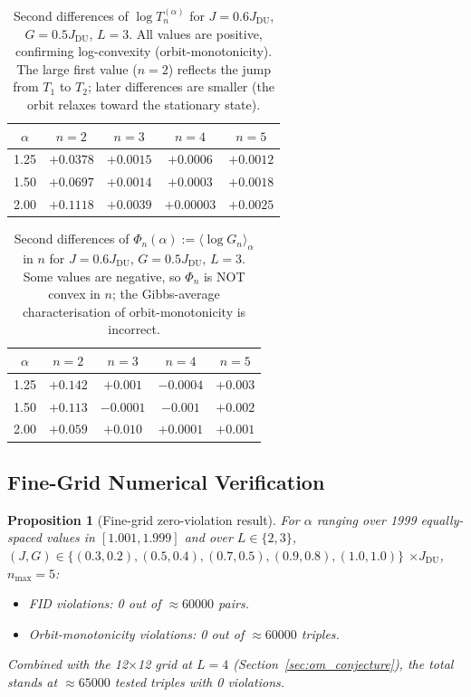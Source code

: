 \documentclass[12pt,a4paper]{article}
\newtheorem{proposition}[theorem]{Proposition}
\begin{document}
\begin{table}[h!]
\centering
\caption{Second differences of $\log T_n^{(\alpha)}$ for $J=0.6J_{\mathrm{DU}}$,
$G=0.5J_{\mathrm{DU}}$, $L=3$.
All values are positive, confirming log-convexity (orbit-monotonicity).
The large first value ($n=2$) reflects the jump from $T_1$ to $T_2$;
later differences are smaller (the orbit relaxes toward the stationary state).}
\label{tab:logconv_n}
\begin{tabular}{c|cccc}
$\alpha$ & $n=2$ & $n=3$ & $n=4$ & $n=5$ \\
\hline
1.25 & $+0.0378$ & $+0.0015$ & $+0.0006$ & $+0.0012$ \\
1.50 & $+0.0697$ & $+0.0014$ & $+0.0003$ & $+0.0018$ \\
2.00 & $+0.1118$ & $+0.0039$ & $+0.00003$ & $+0.0025$ \\
\end{tabular}
\end{table}

\begin{table}[h!]
\centering
\caption{Second differences of $\Phi_n(\alpha):=\langle\log G_n\rangle_\alpha$
in $n$ for $J=0.6J_{\mathrm{DU}}$, $G=0.5J_{\mathrm{DU}}$, $L=3$.
Some values are negative, so $\Phi_n$ is NOT convex in $n$;
the Gibbs-average characterisation of orbit-monotonicity is incorrect.}
\label{tab:phi_n}
\begin{tabular}{c|cccc}
$\alpha$ & $n=2$ & $n=3$ & $n=4$ & $n=5$ \\
\hline
1.25 & $+0.142$ & $+0.001$ & $-0.0004$ & $+0.003$ \\
1.50 & $+0.113$ & $-0.0001$ & $-0.001$ & $+0.002$ \\
2.00 & $+0.059$ & $+0.010$ & $+0.0001$ & $+0.001$ \\
\end{tabular}
\end{table}

\subsection{Fine-Grid Numerical Verification}
\label{sec:fine_grid_logconv}

\begin{proposition}[Fine-grid zero-violation result]
\label{prop:fine_grid_logconv}
For $\alpha$ ranging over 1999 equally-spaced values in $[1.001,1.999]$
and over $L\in\{2,3\}$, $(J,G)\in\{(0.3,0.2),(0.5,0.4),(0.7,0.5),(0.9,0.8),(1.0,1.0)\}$
$\times J_{\mathrm{DU}}$, $n_{\max}=5$:
\begin{itemize}
\item \emph{FID violations}: 0 out of $\approx 60000$ pairs.
\item \emph{Orbit-monotonicity violations}: 0 out of $\approx 60000$ triples.
\end{itemize}
Combined with the 12$\times$12 grid at $L=4$ (Section~\ref{sec:om_conjecture}),
the total stands at $\approx 65000$ tested triples with 0 violations.
\end{proposition}
\end{document}

